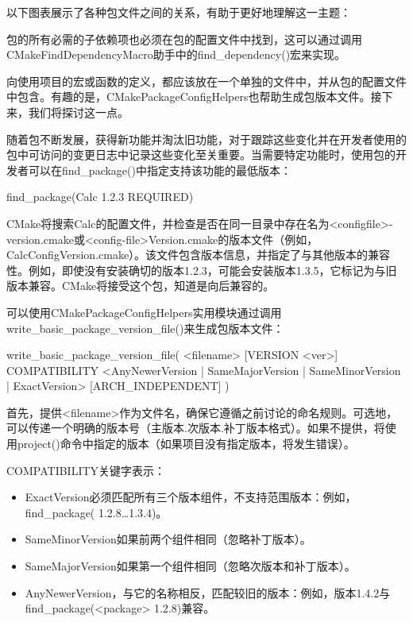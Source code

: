 以下图表展示了各种包文件之间的关系，有助于更好地理解这一主题：


包的所有必需的子依赖项也必须在包的配置文件中找到，这可以通过调用CMakeFindDependencyMacro助手中的find\_dependency()宏来实现。

向使用项目的宏或函数的定义，都应该放在一个单独的文件中，并从包的配置文件中包含。有趣的是，CMakePackageConfigHelpers也帮助生成包版本文件。接下来，我们将探讨这一点。


随着包不断发展，获得新功能并淘汰旧功能，对于跟踪这些变化并在开发者使用的包中可访问的变更日志中记录这些变化至关重要。当需要特定功能时，使用包的开发者可以在find\_package()中指定支持该功能的最低版本：

\begin{cmake}
find_package(Calc 1.2.3 REQUIRED)
\end{cmake}

CMake将搜索Calc的配置文件，并检查是否在同一目录中存在名为<configfile>-version.cmake或<config-file>Version.cmake的版本文件（例如，CalcConfigVersion.cmake）。该文件包含版本信息，并指定了与其他版本的兼容性。例如，即使没有安装确切的版本1.2.3，可能会安装版本1.3.5，它标记为与旧版本兼容。CMake将接受这个包，知道是向后兼容的。

可以使用CMakePackageConfigHelpers实用模块通过调用write\_basic\_package\_version\_file()来生成包版本文件：

\begin{shell}
write_basic_package_version_file(
    <filename> [VERSION <ver>]
    COMPATIBILITY <AnyNewerVersion | SameMajorVersion |
    SameMinorVersion | ExactVersion>
    [ARCH_INDEPENDENT]
)
\end{shell}

首先，提供<filename>作为文件名，确保它遵循之前讨论的命名规则。可选地，可以传递一个明确的版本号（主版本.次版本.补丁版本格式）。如果不提供，将使用project()命令中指定的版本（如果项目没有指定版本，将发生错误）。

COMPATIBILITY关键字表示：

\begin{itemize}
\item
ExactVersion必须匹配所有三个版本组件，不支持范围版本：例如，find\_package( 1.2.8…1.3.4)。

\item
SameMinorVersion如果前两个组件相同（忽略补丁版本）。

\item
SameMajorVersion如果第一个组件相同（忽略次版本和补丁版本）。

\item
AnyNewerVersion，与它的名称相反，匹配较旧的版本：例如，版本1.4.2与find\_package(<package> 1.2.8)兼容。
\end{itemize}

